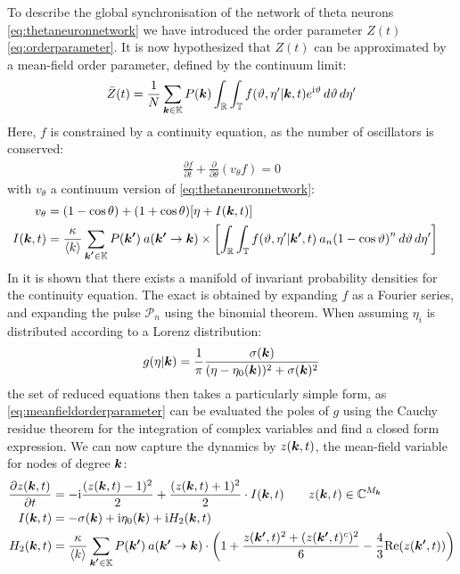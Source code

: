To describe the global synchronisation of the network of theta neurons \eqref{eq:thetaneuronnetwork} we have introduced the order parameter $Z(t)$\eqref{eq:orderparameter}. It is now hypothesized that $Z(t)$ can be approximated by a mean-field order parameter, defined by the continuum limit:
\begin{align}
\bar{Z}(t)= \frac{1}{N} \sum_{\k \in \K}P(\k) \int_{\R} \int_{\T} f\left(\vartheta, \eta^{\prime} | \k, t\right) e^{\ic \vartheta} \mathop{d \vartheta} \mathop{d \eta^{\prime}} \label{eq:meanfieldorderparameter}
\end{align}
Here, $f$ is constrained by a continuity equation, as the number of oscillators is conserved:
\begin{align}
\frac{\partial f}{\partial t}+\frac{\partial}{\partial \theta}\left(v_{\theta} f\right) = 0 \label{eq:transportequation}
\end{align}
with $v_{\theta}$ a continuum version of \eqref{eq:thetaneuronnetwork}:
\begin{align*}
v_{\theta} &= (1-\cos \theta)+(1+\cos \theta) \left[\eta + I(\k,t) \right]\\
I(\k,t) &= \frac{\kappa}{\kmean}\sum_{\kacc \in \K} P(\kacc ) \:a\left(\kacc \rightarrow \k \right) \times \left[ \int_{\R} \int_{\T} f\left(\vartheta, \eta^{\prime} | \kacc, t\right) \: a_{n} \left(1-\cos \vartheta\right)^{n} \mathop{d \vartheta} \mathop{d \eta^{\prime}} \right] &
\end{align*}
In \cite{OttAntonsen2008} it is shown that there exists a manifold of invariant probability densities for the continuity equation. The exact \MFR is obtained by expanding $f$ as a Fourier series, and expanding the pulse $\mathcal{P}_n$ using the binomial theorem. When assuming $\eta_i$ is distributed according to a Lorenz distribution:
\begin{align}
g(\eta |{\boldsymbol{k}})=\frac{1}{\pi} \frac{\sigma({\boldsymbol{k}})}{(\eta-\eta_{0}({\boldsymbol{k}}))^{2}+\sigma({\boldsymbol{k}})^{2}} \label{eq:Lorentzpdf}
\end{align}
the set of reduced equations then takes a particularly simple form, as \eqref{eq:meanfieldorderparameter} can be evaluated the poles of $g$ using the Cauchy residue theorem for the integration of complex variables and find a closed form expression. We can now capture the dynamics by $z({\boldsymbol{k}},t)$, the mean-field variable for nodes of degree ${\boldsymbol{k}}$:
\begin{align}
\frac{\partial z(\k, t)}{\partial t} &= -\ic \frac{(z(\k, t)-1)^{2}}{2} + \frac{(z(\k, t)+1)^{2}}{2} \cdot I(\k, t) \qquad z(\k,t) \in \C^{M_\k} \nonumber \\
I(\k, t) &= -\sigma(\k) + \ic \eta_{0}(\k) + \ic H_2(\k,t) \label{eq:OttAntonsenSystemFull} \\
H_2(\k,t) &= \frac{\kappa}{\kmean} \sum_{\kacc \in \K} P\left(\kacc\right) \: a\left(\kacc \rightarrow \k\right) \cdot \left( 1 + \frac{z(\kacc, t)^2 + (z(\kacc, t)^c )^2}{6} - \frac{4}{3} \Re(z(\kacc, t)) \right) \nonumber
\end{align}
